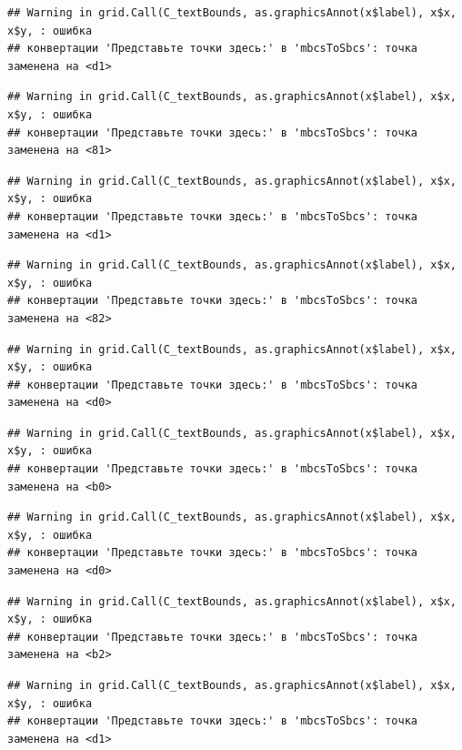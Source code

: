 \documentclass[]{book}
\begin{document}
\begin{verbatim}
## Warning in grid.Call(C_textBounds, as.graphicsAnnot(x$label), x$x, x$y, : ошибка
## конвертации 'Представьте точки здесь:' в 'mbcsToSbcs': точка заменена на <d1>
\end{verbatim}

\begin{verbatim}
## Warning in grid.Call(C_textBounds, as.graphicsAnnot(x$label), x$x, x$y, : ошибка
## конвертации 'Представьте точки здесь:' в 'mbcsToSbcs': точка заменена на <81>
\end{verbatim}

\begin{verbatim}
## Warning in grid.Call(C_textBounds, as.graphicsAnnot(x$label), x$x, x$y, : ошибка
## конвертации 'Представьте точки здесь:' в 'mbcsToSbcs': точка заменена на <d1>
\end{verbatim}

\begin{verbatim}
## Warning in grid.Call(C_textBounds, as.graphicsAnnot(x$label), x$x, x$y, : ошибка
## конвертации 'Представьте точки здесь:' в 'mbcsToSbcs': точка заменена на <82>
\end{verbatim}

\begin{verbatim}
## Warning in grid.Call(C_textBounds, as.graphicsAnnot(x$label), x$x, x$y, : ошибка
## конвертации 'Представьте точки здесь:' в 'mbcsToSbcs': точка заменена на <d0>
\end{verbatim}

\begin{verbatim}
## Warning in grid.Call(C_textBounds, as.graphicsAnnot(x$label), x$x, x$y, : ошибка
## конвертации 'Представьте точки здесь:' в 'mbcsToSbcs': точка заменена на <b0>
\end{verbatim}

\begin{verbatim}
## Warning in grid.Call(C_textBounds, as.graphicsAnnot(x$label), x$x, x$y, : ошибка
## конвертации 'Представьте точки здесь:' в 'mbcsToSbcs': точка заменена на <d0>
\end{verbatim}

\begin{verbatim}
## Warning in grid.Call(C_textBounds, as.graphicsAnnot(x$label), x$x, x$y, : ошибка
## конвертации 'Представьте точки здесь:' в 'mbcsToSbcs': точка заменена на <b2>
\end{verbatim}

\begin{verbatim}
## Warning in grid.Call(C_textBounds, as.graphicsAnnot(x$label), x$x, x$y, : ошибка
## конвертации 'Представьте точки здесь:' в 'mbcsToSbcs': точка заменена на <d1>
\end{verbatim}
\end{document}
